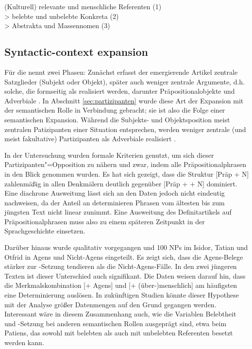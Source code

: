 \begin{exe}
	\ex \label{ex:belebtheitsskala} (Kulturell) relevante und menschliche Referenten (1)\\>  belebte und unbelebte Konkreta (2)\\> Abstrakta und Massennomen (3)
	\end{exe}


\subsection{Syntactic-context expansion} \label{sec:syn-expansion}

Für die  nennt \textcite{Himmelmann2004} zwei Phasen: Zunächst erfasst der emergierende Artikel zentrale Satzglieder (Subjekt oder Objekt), später auch weniger zentrale Argumente, d.h. solche, die formseitig als  realisiert werden, darunter Präpositionalobjekte und Adverbiale \parencite{Himmelmann1998}. In Abschnitt \ref{sec:partizipanten} wurde diese Art der Expansion mit der semantischen Rolle in Verbindung gebracht; sie ist also  die Folge einer semantischen Expansion. Während die Subjekts- und Objektsposition meist zentralen Patizipanten einer Situation entsprechen, werden weniger zentrale (und meist fakultative) Partizipanten als Adverbiale realisiert \parencite{Lehmann2004a}. 

In der Untersuchung wurden formale Kriterien genutzt, um sich dieser Partizipanten"=Opposition zu nähern und zwar, indem alle Präpositionalphrasen in den Blick genommen wurden. Es hat sich gezeigt, dass die Struktur [Präp + N] zahlenmäßig in allen Denkmälern deutlich gegenüber [Präp +  + N] dominiert. Eine diachrone Ausweitung lässt sich an den Daten jedoch nicht eindeutig nachweisen, da der Anteil an determinieren Phrasen vom ältesten bis zum jüngsten Text nicht linear zunimmt. Eine Ausweitung des Definitartikels auf Präpositionalphrasen muss also zu einem späteren Zeitpunkt in der Sprachgeschichte einsetzen. 

Darüber hinaus wurde qualitativ vorgegangen und 100 NPs im Isidor, Tatian und Otfrid in Agens und Nicht-Agens eingeteilt. Es zeigt sich, dass die Agens-Belege stärker zur -Setzung tendieren als die Nicht-Agens-Fälle. In den zwei jüngeren Texten ist dieser Unterschied auch signifikant. Die Daten weisen darauf hin, dass die Merkmalskombination [+ Agens] und [+ (über-)menschlich] am häufigsten eine Determinierung auslösen. In zukünftigen Studien könnte dieser Hypothese mit der Analyse größer Datenmengen auf den Grund gegangen werden. Interessant wäre in diesem Zusammenhang auch, wie die Variablen Belebtheit und -Setzung bei anderen semantischen Rollen ausgeprägt sind, etwa beim Patiens, das sowohl mit belebten als auch mit unbelebten Referenten besetzt werden kann.   

